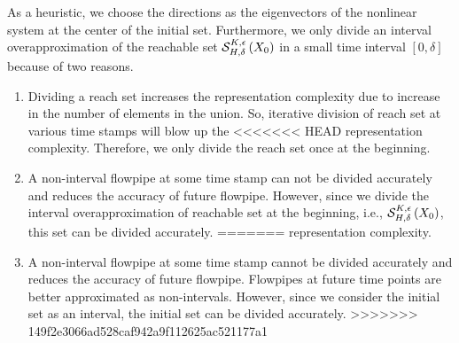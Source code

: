 As a heuristic, we choose the directions as the eigenvectors of the
nonlinear system at the center of the initial set.  Furthermore, we
only divide an interval overapproximation of the reachable set
$\mathcal{S}_{H,\delta}^{K,\epsilon}\left(X_0\right)$ in a small time interval
$[0,\delta]$ because of two reasons.
%
\begin{enumerate}
\item Dividing a reach set increases the representation complexity due to
increase in the number of elements in the union.  So, iterative
division of reach set at various time stamps will blow up the
<<<<<<< HEAD
representation complexity.  Therefore, we only divide the reach set
once at the beginning.
\item  A non-interval flowpipe at some time stamp can not
be divided accurately and reduces the accuracy of future flowpipe.
However, since we divide the interval overapproximation of reachable
set at the beginning, i.e., $\mathcal{S}_{H,\delta}^{K,\epsilon}\left(X_0\right)$,
this set can be divided accurately.
=======
representation complexity.
\item  A non-interval flowpipe at some time stamp cannot
be divided accurately and reduces the accuracy of future flowpipe.
Flowpipes at future time points are better approximated as
non-intervals.  However, since we consider the initial set as an interval, the initial set can be divided accurately.
>>>>>>> 149f2e3066ad528caf942a9f112625ac521177a1
\end{enumerate}
%
%
